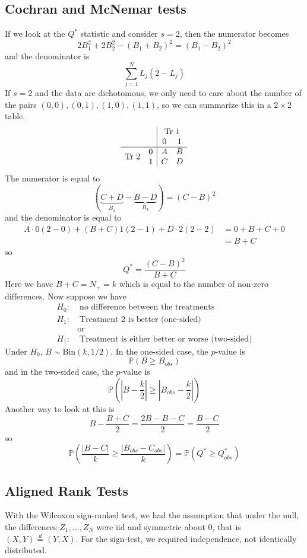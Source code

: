 \documentclass[a4paper,12pt]{amsart}
\newcommand{\sumjN}{\sum_{j=1}^N}
\newcommand{\p}[1]{\mathbb{P}\left(#1\right)}
\begin{document}
\subsection{Cochran and McNemar tests}
If we look at the $Q^*$ statistic and consider $s=2$, then the numerator becomes
\[2B_1^2 + 2 B_2^2 - (B_1 + B_2)^2 = (B_1 - B_2)^2\]
and the denominator is 
\[\sumjN L_j(2 - L_j)\]
If $s=2$ and the data are dichotomous, we only need to care about the number of the pairs $(0,0), (0,1), (1,0), (1,1)$, so we can summarize this in a $2 \times 2$ table.
\[\begin{array}{cc|cc}
& & \multicolumn{2}{c}{\text{Tr 1}}\\
& & 0 & 1\\
\hline
\multirow{2}{*}{\text{Tr 2}} & 0 & A & B\\
& 1 & C & D
\end{array}\]
The numerator is equal to 
\[(\underbrace{C+D}_{B_1} - \underbrace{B-D}_{B_2}) = (C-B)^2\]
and the denominator is equal to
\begin{align*}
A\cdot 0(2-0) + (B+C)1(2-1) + D \cdot 2(2-2) &= 0 + B+C +0\\
&= B+C
\end{align*}
so
\[Q^* = \frac{(C-B)^2}{B+C}\]
Here we have $B+C = N_+ =k$ which is equal to the number of non-zero differences.
Now suppose we have
\begin{align*}
H_0: & \; \text{no difference between the treatments}\\
H_1: & \; \text{Treatment 2 is better (one-sided)}\\
& \text{or}\\
H_1: & \; \text{Treatment is either better or worse (two-sided)}
\end{align*}
Under $H_0$, $B \sim \text{Bin}(k,1/2)$.
In the one-sided case, the $p$-value is 
\[\p{B \geq B_{obs}}\]
and in the two-sided case, the $p$-value is
\[\p{\left|B - \frac{k}{2}\right| \geq \left|B_{obs} - \frac{k}{2}\right|}\]
Another way to look at this is
\[B - \frac{B+C}{2} = \frac{2B-B-C}{2} = \frac{B-C}{2}\]
so
\[\p{\frac{|B-C|}{k} \geq \frac{|B_{obs} - C_{obs}|}{k}} = \p{Q^* \geq Q^*_{obs}}\]

\subsection{Aligned Rank Tests}
With the Wilcoxon sign-ranked test, we had the assumption that under the null, the differences $Z_1, \ldots, Z_N$ were iid and symmetric about 0, that is $(X,Y) \overset{d}{=} (Y,X)$. For the sign-test, we required independence, not identically distributed.
\end{document}
